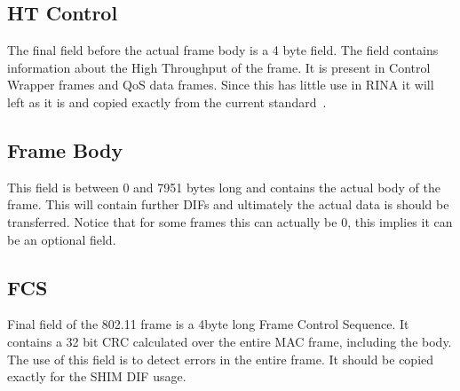 \subsection{HT Control}

The final field before the actual frame body is a 4 byte field. The field contains information about the High Throughput of the frame. It is present in Control Wrapper frames and QoS data frames. Since this has little use in RINA it will left as it is and copied exactly from the current standard~\citep{ieee80211std}.

\subsection{Frame Body}

This field is between 0 and 7951 bytes long and contains the actual body of the frame. This will contain further DIFs and ultimately the actual data is should be transferred. Notice that for some frames this can actually be 0, this implies it can be an optional field.

\subsection{FCS}

Final field of the 802.11 frame is a 4byte long Frame Control Sequence. It contains a 32 bit CRC calculated over the entire MAC frame, including the body. The use of this field is to detect errors in the entire frame. It should be copied exactly for the SHIM DIF usage.
